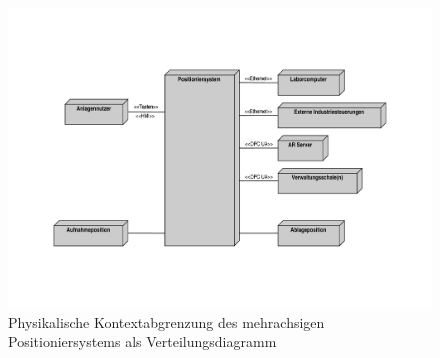 \documentclass[../Bachelorarbeit.tex]{subfiles}
\begin{document}
\begin{figure}[h]
    \centering
    \includegraphics[width=\textwidth]{Images/phys_abgrenzung.pdf}
    \caption[Physikalische Kontextabgrenzung]{Physikalische Kontextabgrenzung des mehrachsigen Positioniersystems als Verteilungsdiagramm}
    \label{fig:my-img2}
\end{figure}
\end{document}
